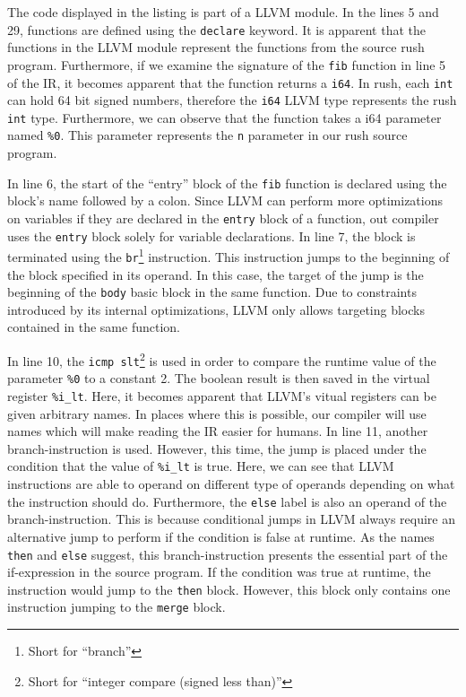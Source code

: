 
The code displayed in the listing is part of a LLVM module.
In the lines 5 and 29, functions are defined using the \texttt{declare} keyword.
It is apparent that the functions in the LLVM module represent the functions from the source rush program.
Furthermore, if we examine the signature of the \texttt{fib} function in line 5 of the IR,
it becomes apparent that the function returns a \texttt{i64}.
In rush, each \texttt{int} can hold 64 bit signed numbers, therefore the \texttt{i64} LLVM type represents the rush \texttt{int} type.
Furthermore, we can observe that the function takes a i64 parameter named \texttt{\%0}.
This parameter represents the \texttt{n} parameter in our rush source program.

In line 6, the start of the \enquote{entry} block of the \texttt{fib} function is declared using the block's name followed by a colon.
Since LLVM can perform more optimizations on variables if they are declared in the \texttt{entry} block of a function,
out compiler uses the \texttt{entry} block solely for variable declarations.
In line 7, the block is terminated using the \texttt{br}\footnote{Short for \enquote{branch}} instruction.
This instruction jumps to the beginning of the block specified in its operand.
In this case, the target of the jump is the beginning of the \texttt{body} basic block in the same function.
Due to constraints introduced by its internal optimizations, LLVM only allows targeting blocks contained in the same function.

In line 10, the \texttt{icmp slt}\footnote{Short for \enquote{integer compare (signed less than)}} is used in order to compare the runtime value of the parameter \texttt{\%0} to a constant 2.
The boolean result is then saved in the virtual register \texttt{\%i\_lt}.
Here, it becomes apparent that LLVM's vitual registers can be given arbitrary names.
In places where this is possible, our compiler will use names which will make reading the IR easier for humans.
In line 11, another branch-instruction is used.
However, this time, the jump is placed under the condition that the value of \texttt{\%i\_lt} is true.
Here, we can see that LLVM instructions are able to operand on different type of operands depending on what the instruction should do.
Furthermore, the \texttt{else} label is also an operand of the branch-instruction.
This is because conditional jumps in LLVM always require an alternative jump to perform if the condition is false at runtime.
As the names \texttt{then} and \texttt{else} suggest, this branch-instruction presents the essential part of the if-expression in the source program.
If the condition was true at runtime, the instruction would jump to the \texttt{then} block.
However, this block only contains one instruction jumping to the \texttt{merge} block.

